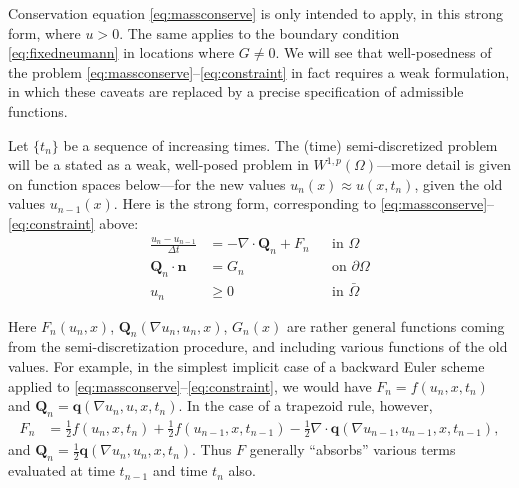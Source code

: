 \documentclass[final,leqno,onefignum,onetabnum]{siamltex1213bueler}
\newcommand\bn{\mathbf{n}}
\newcommand\bq{\mathbf{q}}
\newcommand\bQ{\mathbf{Q}}
\newcommand{\Div}{\nabla\cdot}
\renewcommand{\grad}{\nabla}
\begin{document}
Conservation equation \eqref{eq:massconserve} is only intended to apply, in this strong form, where $u>0$.  The same applies to the boundary condition \eqref{eq:fixedneumann} in locations where $G\ne 0$.  We will see that well-posedness of the problem \eqref{eq:massconserve}--\eqref{eq:constraint} in fact requires a weak formulation, in which these caveats are replaced by a precise specification of admissible functions.

Let $\{t_n\}$ be a sequence of increasing times.  The (time) semi-discretized problem will be a stated as a weak, well-posed problem in $W^{1,p}(\Omega)$---more detail is given on function spaces below---for the new values $u_n(x) \approx u(x,t_n)$, given the old values $u_{n-1}(x)$.  Here is the strong form, corresponding to \eqref{eq:massconserve}--\eqref{eq:constraint} above:
\begin{align}
\frac{u_n - u_{n-1}}{\Delta t} &= - \Div \bQ_n + F_n &&\text{in } \Omega \label{eq:semimassconserve} \\
\bQ_n \cdot \bn &= G_n &&\text{on } \partial\Omega \label{eq:semifixedneumann} \\
u_n &\ge 0 &&\text{in } \bar\Omega \label{eq:semiconstraint}
\end{align}

Here $F_n(u_n,x)$, $\bQ_n(\grad u_n,u_n,x)$, $G_n(x)$ are rather general functions coming from the semi-discretization procedure, and including various functions of the old values.  For example, in the simplest implicit case of a backward Euler scheme applied to \eqref{eq:massconserve}--\eqref{eq:constraint}, we would have $F_n = f(u_n,x,t_n)$ and $\bQ_n = \bq(\grad u_n,u,x,t_n)$.  In the case of a trapezoid rule, however,
\begin{align*}
F_n &= \frac{1}{2} f(u_n,x,t_n) + \frac{1}{2} f(u_{n-1},x,t_{n-1}) - \frac{1}{2} \Div \bq(\grad u_{n-1},u_{n-1},x,t_{n-1}),
\end{align*}
and $\bQ_n = \frac{1}{2} \bq(\grad u_n,u_n,x,t_n)$.  Thus $F$ generally ``absorbs'' various terms evaluated at time $t_{n-1}$ and time $t_n$ also.
\end{document}
